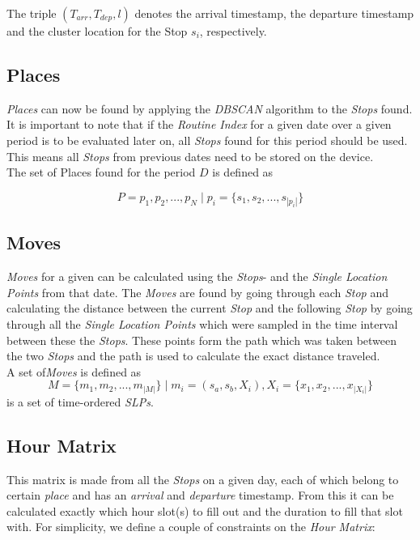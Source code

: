 The triple $(T_{arr}, T_{dep}, l)$ denotes the arrival timestamp, the departure timestamp and the cluster location for the Stop $s_i$, respectively.

\subsection{Places}
\textit{Places} can now be found by applying the \textit{DBSCAN} algorithm to the \textit{Stops} found. It is important to note that if the \textit{Routine Index} for a given date over a given period is to be evaluated later on, all \textit{Stops} found for this period should be used. This means all \textit{Stops} from previous dates need to be stored on the device. \\

The set of Places found for the period $D$ is defined as 

$$P = {p_1, p_2, ..., p_N} \;|\; p_i = \{s_1, s_2, ..., s_{|p_i|}\}$$

\subsection{Moves}
\textit{Moves} for a given can be calculated using the \textit{Stops}- and the \textit{Single Location Points} from that date. The \textit{Moves} are found by going through each \textit{Stop} and calculating the distance between the current \textit{Stop} and the following \textit{Stop} by going through all the \textit{Single Location Points} which were sampled in the time interval between these the \textit{Stops}. These points form the path which was taken between the two \textit{Stops} and the path is used to calculate the exact distance traveled.\\

A set of\textit{Moves} is defined as $$M = \{m_1, m_2, ..., m_{|M|}\} \;| \; m_i = (s_a, s_b, X_i), X_i = \{x_1, x_2, ..., x_{|X_i|}\}$$ is a set of time-ordered \textit{SLPs}.\\

\subsection{Hour Matrix}
This matrix is made from all the \textit{Stops} on a given day, each of which belong to certain \textit{place} and has an \textit{arrival} and \textit{departure} timestamp. From this it can be calculated exactly which hour slot(s) to fill out and the duration to fill that slot with. For simplicity, we define a couple of constraints on the \textit{Hour Matrix}:

